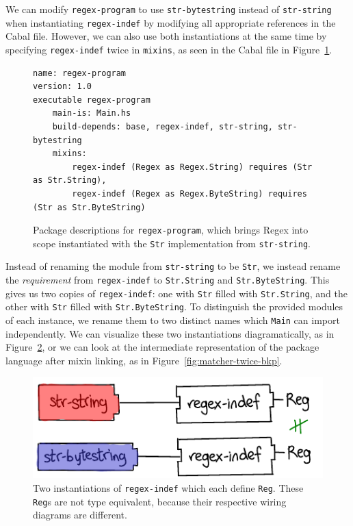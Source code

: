 We can modify \verb|regex-program| to use \verb|str-bytestring| instead
of \verb|str-string| when instantiating \verb|regex-indef| by modifying
all appropriate references in the Cabal file.  However, we can also use
both instantiations at the same time by specifying \verb|regex-indef|
twice in \verb|mixins|, as seen in the Cabal file in
Figure~\ref{fig:regex-program-multi}.

\begin{figure}
\begin{verbatim}
name: regex-program
version: 1.0
executable regex-program
    main-is: Main.hs
    build-depends: base, regex-indef, str-string, str-bytestring
    mixins:
        regex-indef (Regex as Regex.String) requires (Str as Str.String),
        regex-indef (Regex as Regex.ByteString) requires (Str as Str.ByteString)
\end{verbatim}
\caption{Package descriptions for \texttt{regex-program}, which brings
Regex into scope instantiated with the \texttt{Str} implementation from \texttt{str-string}.}
\label{fig:regex-program-multi}
\end{figure}

Instead of renaming the module from \verb|str-string| to be \verb|Str|,
we instead rename the \emph{requirement} from \verb|regex-indef| to
\verb|Str.String| and \verb|Str.ByteString|.  This gives us two copies
of \verb|regex-indef|: one with \verb|Str| filled with
\verb|Str.String|, and the other with \verb|Str| filled with
\verb|Str.ByteString|.  To distinguish the provided modules of each
instance, we rename them to two distinct names which \verb|Main|
can import independently.  We can visualize these two instantiations
diagramatically, as in Figure~\ref{fig:regex-indef-twice}, or
we can look at the intermediate representation of the package language
after mixin linking, as in Figure~\ref{fig:matcher-twice-bkp}.

\begin{figure}
\center\includegraphics{figures/regex-indef-twice.pdf}
\caption{Two instantiations of \texttt{regex-indef} which each define
\texttt{Reg}.  These \texttt{Reg}s are not type equivalent, because
their respective wiring diagrams are different.}
\label{fig:regex-indef-twice}
\end{figure}

